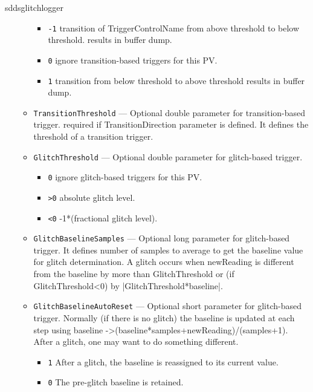 \begin{sddsprog}{sddsglitchlogger}
\begin{itemize}
\begin{itemize}
    \begin{itemize}
      \item {\tt -1}  transition of TriggerControlName from above threshold to below threshold.
                        results in buffer dump.
      \item {\tt 0}   ignore transition-based triggers for this PV.
      \item {\tt 1}   transition from below threshold to above threshold results in buffer dump.
    \end{itemize}
    \item {\tt TransitionThreshold}  --- Optional double parameter for transition-based trigger.
                required if TransitionDirection parameter is defined. It defines the threshold of
                a transition trigger.
    \item {\tt GlitchThreshold} --- Optional double parameter for glitch-based trigger.
    \begin{itemize}
      \item {\tt 0}   ignore glitch-based triggers for this PV.
      \item {\tt >0}   absolute glitch level.
      \item {\tt <0}   -1*(fractional glitch level).
    \end{itemize}
    \item {\tt GlitchBaselineSamples} --- Optional long parameter for glitch-based trigger.
                It defines number of samples to average to get the baseline value for glitch determination.
                A glitch occurs when newReading is different from the baseline by more than GlitchThreshold
                or (if GlitchThreshold<0) by |GlitchThreshold*baseline|.
    \item {\tt GlitchBaselineAutoReset} --- Optional short parameter for glitch-based trigger. \newline
                Normally (if there is no glitch) the baseline is updated at each step using \newline
                baseline -\textgreater (baseline*samples+newReading)/(samples+1). \newline
                After a glitch, one may want to do something different.
    \begin{itemize}
      \item {\tt 1}   After a glitch, the baseline is reassigned to its current value.
      \item {\tt 0}   The pre-glitch baseline is retained.
    \end{itemize}

\end{itemize}
\end{itemize}
\end{sddsprog}
